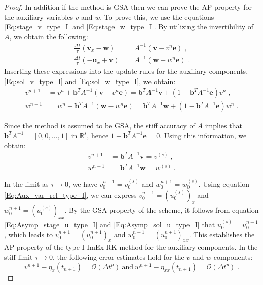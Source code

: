 \documentclass{article}
\newcommand{\ukdv}{\eta}
\newcommand{\tIAim}{A}
\newcommand{\tIbim}{\pmb{b}}
\begin{document}
\begin{proof}
In addition if the method is GSA then we can prove the AP property for the auxiliary variables $v$ and $w$. To prove this, we use the equations \eqref{Eq:stage_v_type_I} and \eqref{Eq:stage_w_type_I}. By utilizing the invertibility of $\tIAim$, we obtain the following:
\begin{subequations}
\begin{align*}
    \frac{\Delta t}{\tau} (\pmb{v}_x-\pmb{w}) & = \tIAim^{-1}(\pmb{v}-v^n \pmb{e}) \;,  \\
    \frac{\Delta t}{\tau} (-\pmb{u}_x+\pmb{v}) & = \tIAim^{-1}(\pmb{w}-w^n \pmb{e})  \;.
\end{align*}
\end{subequations}
Inserting these expressions into the update rules for the auxiliary components, \eqref{Eq:sol_v_type_I} and \eqref{Eq:sol_w_type_I}, we obtain:
\begin{subequations}
\begin{align*}
    v^{n+1} &= v^n  + \tIbim^T\tIAim^{-1}(\pmb{v}-v^n \pmb{e}) =  \tIbim^T\tIAim^{-1}\pmb{v} + (1-\tIbim^T\tIAim^{-1} \pmb{e} )v^n  \;, \\
    w^{n+1} & = w^n + \tIbim^T\tIAim^{-1}(\pmb{w}-w^n \pmb{e}) =  \tIbim^T\tIAim^{-1}\pmb{w} + (1-\tIbim^T\tIAim^{-1} \pmb{e} )w^n  \;.
\end{align*}
\end{subequations}

Since the method is assumed to be GSA, the stiff accuracy of $\tIAim$ implies that $\tIbim^T\tIAim^{-1} = [0, 0, \dots, 1]$ in $\mathbb{R}^{s}$, hence $1 - \tIbim^T\tIAim^{-1} \pmb{e} = 0$. Using this information, we obtain:
\begin{subequations}
\begin{align*}
    v^{n+1} &= \tIbim^T\tIAim^{-1}\pmb{v} = v^{(s)} \;, \\
    w^{n+1} &= \tIbim^T\tIAim^{-1}\pmb{w} = w^{(s)} \;.
\end{align*}
\end{subequations}

In the limit as $\tau \to 0$, we have $v_0^{n+1} = v_0^{(s)}$ and $w_0^{n+1} = w_0^{(s)}$. Using equation
\eqref{Eq:Aux_var_rel_type_I}, we can express $v_0^{n+1} = (u_0^{(s)})_x$ and $w_0^{n+1} = (u_0^{(s)})_{xx}$.
By the GSA property of the scheme, it follows from equation \eqref{Eq:Asymp_stage_u_type_I} and \eqref{Eq:Asymp_sol_u_type_I}
that $u_0^{(s)} = u_0^{n+1}$, which leads to $v_0^{n+1} = (u_0^{n+1})_x$ and $w_0^{n+1} = (u_0^{n+1})_{xx}$.
This establishes the AP property of the type I ImEx-RK method for the auxiliary components. In the stiff limit $\tau \to 0$,
the following error estimates hold for the $v$ and $w$ components:
$$v^{n+1} - \ukdv_{x}(t_{n+1}) = \mathcal{O}(\Delta t^p) \ \text{and} \ w^{n+1} - \ukdv_{xx}(t_{n+1}) = \mathcal{O}(\Delta t^p) \;.$$
\end{proof}
\end{document}
